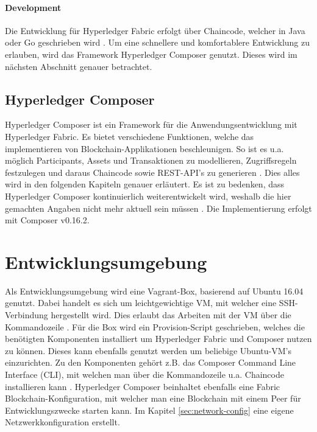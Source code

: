 \paragraph{Development}
Die Entwicklung für Hyperledger Fabric erfolgt über Chaincode, welcher in Java oder Go geschrieben wird \cite{HyperledgerFabricTeamSDKsHyperledgerFabric}. Um eine schnellere und komfortablere Entwicklung zu erlauben, wird das Framework Hyperledger Composer genutzt. Dieses wird im nächsten Abschnitt genauer betrachtet.


\subsection{Hyperledger Composer}
Hyperledger Composer ist ein Framework für die Anwendungsentwicklung mit Hyperledger Fabric. Es bietet verschiedene Funktionen, welche das implementieren von Blockchain-Applikationen beschleunigen. So ist es u.a. möglich Participants, Assets und Transaktionen zu modellieren, Zugriffsregeln festzulegen und daraus Chaincode sowie REST-API's zu generieren \cite{HyperledgerComposerTeamIntroductionHyperledgerComposer}. Dies alles wird in den folgenden Kapiteln genauer erläutert. Es ist zu bedenken, dass Hyperledger Composer kontinuierlich weiterentwickelt wird, weshalb die hier gemachten Angaben nicht mehr aktuell sein müssen \cite{HyperledgerComposerTeamHyperledgerComposerReleases2018}. Die Implementierung erfolgt mit Composer v0.16.2.

\section{Entwicklungsumgebung}
Als Entwicklungsumgebung wird eine Vagrant-Box, basierend auf Ubuntu 16.04 genutzt. Dabei handelt es sich um leichtgewichtige VM, mit welcher eine SSH-Verbindung hergestellt wird. Dies erlaubt das Arbeiten mit der VM über die Kommandozeile \cite{VagrantTeamVagrantHashiCorp}. Für die Box wird ein Provision-Script geschrieben, welches die benötigten Komponenten installiert um Hyperledger Fabric und Composer nutzen zu können. Dieses kann ebenfalls genutzt werden um beliebige Ubuntu-VM's einzurichten. Zu den Komponenten gehört z.B. das Composer Command Line Interface (CLI), mit welchen man über die Kommandozeile u.a. Chaincode installieren kann \cite{HyperledgerComposerTeamDevelopmentEnvironmentHyperledger}. Hyperledger Composer beinhaltet ebenfalls eine Fabric Blockchain-Konfiguration, mit welcher man eine Blockchain mit einem Peer für Entwicklungszwecke starten kann. Im Kapitel \ref{sec:network-config} eine eigene Netzwerkkonfiguration erstellt.

